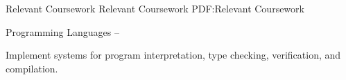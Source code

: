 \Section
{Relevant Coursework}
{Relevant Coursework}
{PDF:Relevant Coursework}

\Entry
\UMassTitle
\SubEntry
\Gap
Programming Languages
\dotfill
{} -- 
\begin{Detail}
    \SubBulletItem
    Implement systems for program interpretation, type checking, verification, and compilation.
\end{Detail}
